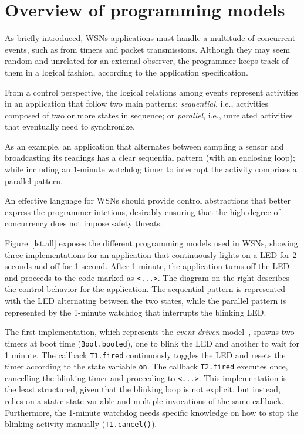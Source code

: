 \documentclass[10pt]{sensys-proc}
\newcommand{\code}[1] {{\small{\texttt{#1}}}}
\begin{document}
\section{Overview of programming models}
\label{sec.overview}

As briefly introduced, WSNs applications must handle a multitude of concurrent 
events, such as from timers and packet transmissions.
Although they may seem random and unrelated for an external observer, the 
programmer keeps track of them in a logical fashion, according to the 
application specification.

From a control perspective, the logical relations among events represent 
activities in an application that follow two main patterns: \emph{sequential}, 
i.e., activities composed of two or more states in sequence; or 
\emph{parallel}, i.e., unrelated activities that eventually need to 
synchronize.

As an example, an application that alternates between sampling a sensor and 
broadcasting its readings has a clear sequential pattern (with an enclosing 
loop); while including an 1-minute watchdog timer to interrupt the activity 
comprises a parallel pattern.

An effective language for WSNs should provide control abstractions that better 
express the programmer intetions, desirably ensuring that the high degree of 
concurrency does not impose safety threats.

Figure~\ref{lst.all} exposes the different programming models used in WSNs, 
showing three implementations for an application that continuously lights on a 
LED for 2 seconds and off for 1 second.
After 1 minute, the application turns off the LED and proceeds to the code 
marked as \code{<...>}.
The diagram on the right describes the control behavior for the application.
The sequential pattern is represented with the LED alternating between the two 
states, while the parallel pattern is represented by the 1-minute watchdog that 
interrupts the blinking LED.

The first implementation, which represents the \emph{event-driven} 
model~\cite{wsn.nesc,wsn.contiki}, spawns two timers at boot time 
(\code{Boot.booted}), one to blink the LED and another to wait for 1 minute.
The callback \code{T1.fired} continuously toggles the LED and resets the timer 
according to the state variable \code{on}.
The callback \code{T2.fired} executes once, cancelling the blinking timer and 
proceeding to \code{<...>}.
This implementation is the least structured, given that the blinking loop is 
not explicit, but instead, relies on a static state variable and multiple 
invocations of the same callback.
Furthermore, the 1-minute watchdog needs specific knowledge on how to stop the 
blinking activity manually (\code{T1.cancel()}).
\end{document}
